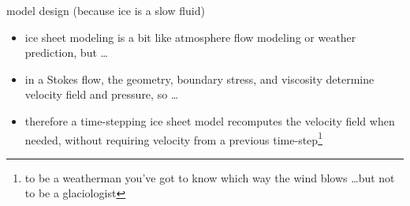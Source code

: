 \documentclass[hide notes,intlimits]{beamer}
\begin{document}
\begin{frame}{model design (because ice is a slow fluid)}

\begin{itemize}
\item ice sheet modeling is a bit like atmosphere flow modeling or weather prediction, but \dots
\item in a Stokes flow, the geometry, boundary stress, and viscosity determine velocity field and pressure, so \dots
\item therefore a time-stepping ice sheet model recomputes the velocity field when needed, without requiring velocity from a previous time-step\footnote{to be a weatherman you've got to know which way the wind blows \dots but not to be a glaciologist}
\end{itemize}
\end{frame}
\end{document}
